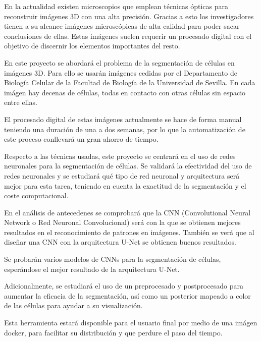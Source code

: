 
En la actualidad existen microscopios que emplean técnicas ópticas para reconstruir imágenes 3D con una alta precisión. Gracias a esto los investigadores tienen a su alcance imágenes microscópicas de alta calidad para poder sacar conclusiones de ellas. Estas imágenes suelen requerir un procesado digital con el objetivo de discernir los elementos importantes del resto.

En este proyecto se abordará el problema de la segmentación de células en imágenes 3D. Para ello se usarán imágenes  cedidas por el Departamento de Biología Celular de la Facultad de Biología de la Universidad de Sevilla. En cada imágen hay decenas de células, todas en contacto con otras células sin espacio entre ellas.

El procesado digital de estas imágenes actualmente se hace de forma manual teniendo una duración de una a dos semanas, por lo que la automatización de este proceso conllevará un gran ahorro de tiempo.

Respecto a las técnicas usadas, este proyecto se centrará en el uso de redes neuronales para la segmentación de células. Se validará la efectividad del uso de redes neuronales y se estudiará qué tipo de red neuronal y arquitectura será mejor para esta tarea, teniendo en cuenta la exactitud de la segmentación y el coste computacional.

En el análisis de antecedenes se comprobará que la CNN (Convolutional Neural Network o Red Neuronal Convolucional) será con la que se obtienen mejores resultados en el reconocimiento de patrones en imágenes. También se verá que al diseñar una CNN con la arquitectura U-Net se obtienen buenos resultados.

Se probarán varios modelos de CNNs para la segmentación de células, esperándose el mejor resultado de la arquitectura U-Net.

Adicionalmente, se estudiará el uso de un preprocesado y postprocesado para aumentar la eficacia de la segmentación, así como un posterior mapeado a color de las células para ayudar a su visualización.

Esta herramienta estará disponible para el usuario final por medio de una imágen docker, para facilitar su distribución y que perdure el paso del tiempo.
